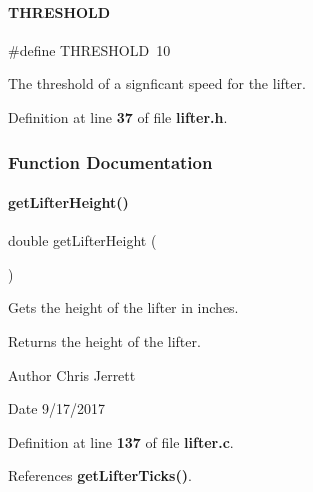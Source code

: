 \paragraph{T\+H\+R\+E\+S\+H\+O\+LD}
{\footnotesize\ttfamily \#define T\+H\+R\+E\+S\+H\+O\+LD~10}



The threshold of a signficant speed for the lifter. 



Definition at line \textbf{ 37} of file \textbf{ lifter.\+h}.



\subsubsection{Function Documentation}
\mbox{\label{lifter_8h_a2719740958fd8a5926f88f6194e820e3}} 
\paragraph{get\+Lifter\+Height()}
{\footnotesize\ttfamily double get\+Lifter\+Height (\begin{DoxyParamCaption}{ }\end{DoxyParamCaption})}



Gets the height of the lifter in inches. 

\begin{DoxyReturn}{Returns}
the height of the lifter. 
\end{DoxyReturn}
\begin{DoxyAuthor}{Author}
Chris Jerrett 
\end{DoxyAuthor}
\begin{DoxyDate}{Date}
9/17/2017 
\end{DoxyDate}


Definition at line \textbf{ 137} of file \textbf{ lifter.\+c}.



References \textbf{ get\+Lifter\+Ticks()}.


